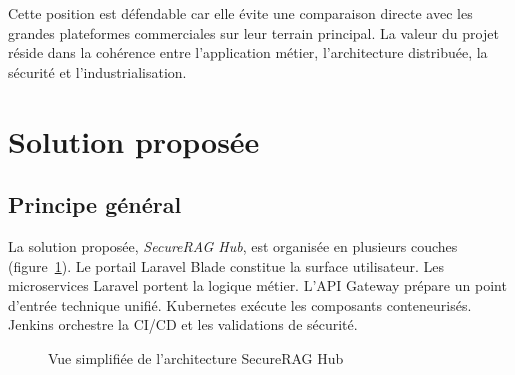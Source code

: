 Cette position est défendable car elle évite une comparaison directe avec les grandes plateformes commerciales sur leur terrain principal. La valeur du projet réside dans la cohérence entre l'application métier, l'architecture distribuée, la sécurité et l'industrialisation.

\section{Solution proposée}
\label{sec:solution}

\subsection{Principe général}

La solution proposée, \textit{SecureRAG Hub}, est organisée en plusieurs couches (figure~\ref{fig:vue_simplifiee_securerag}). Le portail Laravel Blade constitue la surface utilisateur. Les microservices Laravel portent la logique métier. L'API Gateway prépare un point d'entrée technique unifié. Kubernetes exécute les composants conteneurisés. Jenkins orchestre la CI/CD et les validations de sécurité.

\begin{figure}[htbp]
    \centering
    \caption{Vue simplifiée de l'architecture SecureRAG Hub}
    \label{fig:vue_simplifiee_securerag}
\end{figure}

